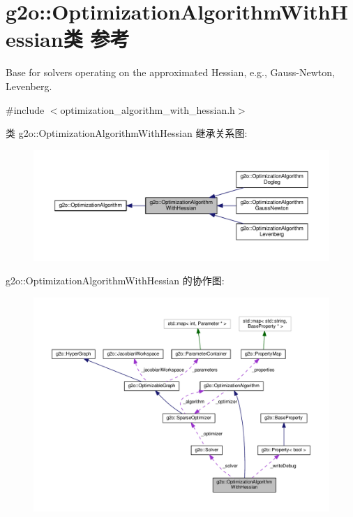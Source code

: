 \hypertarget{classg2o_1_1OptimizationAlgorithmWithHessian}{\section{g2o\-:\-:Optimization\-Algorithm\-With\-Hessian类 参考}
\label{classg2o_1_1OptimizationAlgorithmWithHessian}
}


Base for solvers operating on the approximated Hessian, e.\-g., Gauss-\/\-Newton, Levenberg.  




{\ttfamily \#include $<$optimization\-\_\-algorithm\-\_\-with\-\_\-hessian.\-h$>$}



类 g2o\-:\-:Optimization\-Algorithm\-With\-Hessian 继承关系图\-:
\nopagebreak
\begin{figure}[H]
\begin{center}
\leavevmode
\includegraphics[width=350pt]{classg2o_1_1OptimizationAlgorithmWithHessian__inherit__graph}
\end{center}
\end{figure}


g2o\-:\-:Optimization\-Algorithm\-With\-Hessian 的协作图\-:
\nopagebreak
\begin{figure}[H]
\begin{center}
\leavevmode
\includegraphics[width=350pt]{classg2o_1_1OptimizationAlgorithmWithHessian__coll__graph}
\end{center}
\end{figure}
